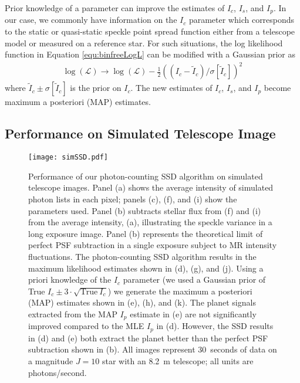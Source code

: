 \documentclass[../main.tex]{subfiles}
\begin{document}
Prior knowledge of a parameter can improve the estimates of $I_c$, $I_s$, and $I_p$. In our case, we commonly have information on the $I_c$ parameter which corresponds to the static or quasi-static speckle point spread function either from a telescope model or measured on a reference star. For such situations, the log likelihood function in Equation \eqref{equ:binfreeLogL} can be modified with a Gaussian prior as
\begin{equation}
\begin{aligned}
\log(\mathcal{L}) \rightarrow \log(\mathcal{L}) - \frac{1}{2} \left(\left(I_c - \tilde{I}_c\right)/\sigma[\tilde{I}_c]\right)^2
\end{aligned}
\end{equation}
where $\tilde{I}_c \pm \sigma [\tilde{I}_c]$ is the prior on $I_c$. The new estimates of $I_c$, $I_s$, and $I_p$ become maximum a posteriori (MAP) estimates. 

\subsection{Performance on Simulated Telescope Image}

\begin{figure*}
    \centering
    \texttt{[image: simSSD.pdf]}
    \caption[The photon-counting SSD algorithm using simulated telescope images]{Performance of our photon-counting SSD algorithm on simulated telescope images.  Panel (a) shows the average intensity of simulated photon lists in each pixel; panels (c), (f), and (i) show the parameters used. Panel (b) subtracts stellar flux from (f) and (i) from the average intensity, (a), illustrating the speckle variance in a long exposure image. Panel (b) represents the theoretical limit of perfect PSF subtraction in a single exposure subject to MR intensity fluctuations. The photon-counting SSD algorithm results in the maximum likelihood estimates shown in (d), (g), and (j). Using a priori knowledge of the $I_c$ parameter (we used a Gaussian prior of True $I_c \pm 3\cdot \sqrt{\text{True}~I_c}$) we generate the maximum a posteriori (MAP) estimates shown in (e), (h), and (k). The planet signals extracted from the MAP $I_p$ estimate in (e) are not significantly improved compared to the MLE $I_p$ in (d). However, the SSD results in (d) and (e) both extract the planet better than the perfect PSF subtraction shown in (b). All images represent 30~seconds of data on a magnitude $J=10$ star with an 8.2~m telescope; all units are photons/second. 
    }
    \label{fig:image}
\end{figure*}
\end{document}
